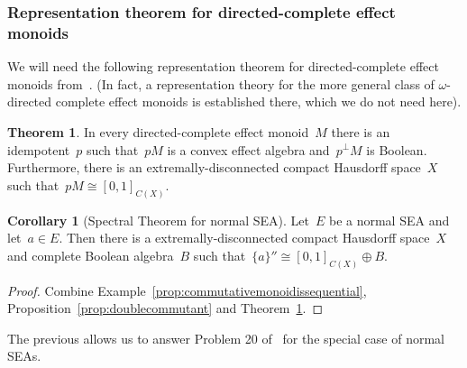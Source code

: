 \documentclass[a4paper, onecolumn, accepted=2020-12-22]{quantumarticle}
\newcounter{counter}
\theoremstyle{definition}
\newtheorem{theorem}[counter]{Theorem}
\newtheorem{corollary}[counter]{Corollary}
\begin{document}
\subsubsection{Representation theorem for directed-complete effect monoids}\label{sec:representation-theorem}
We will need the following representation theorem
for directed-complete effect monoids from~\cite{first}.
(In fact,
a representation theory for the more general class
of $\omega$-directed complete
effect monoids is established there,
which we do not need here).
\begin{theorem}{\cite{first}}\label{thm:first}
In every directed-complete effect monoid~$M$
there is an idempotent~$p$
    such that~$p M$ is a convex effect algebra
        and~$p^\perp M$ is Boolean.
    Furthermore, there is an extremally-disconnected
        compact Hausdorff space~$X$
        such that~$pM \cong [0,1]_{C(X)}$.
\end{theorem}

\begin{corollary}[Spectral Theorem for normal SEA]\label{seaspectral}
    Let~$E$ be a normal SEA and let~$a \in E$.
    Then there is a extremally-disconnected compact Hausdorff space~$X$
        and complete Boolean algebra~$B$
        such that~$\{a\}'' \cong [0,1]_{C(X)} \oplus B$.
\end{corollary}
\begin{proof}
    Combine Example~\ref{prop:commutativemonoidissequential},
    Proposition~\ref{prop:doublecommutant}
    and Theorem~\ref{thm:first}.
\end{proof}

\noindent The previous allows us to answer Problem 20
    of~\cite{gudder2005open} for the
special case of normal SEAs.
\end{document}
